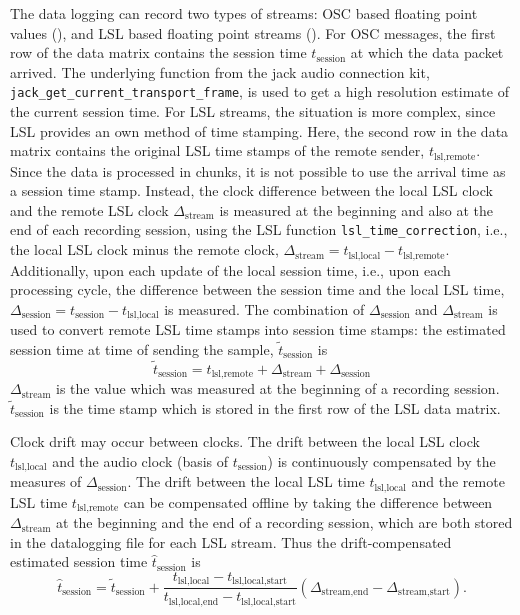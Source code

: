 The data logging can record two types of streams: OSC based floating
point values (), and LSL based floating point streams
().
%
For OSC messages, the first row of the data matrix contains the
session time $t_\text{session}$ at which the data packet arrived.
%
The underlying function from the jack audio connection kit,
\verb!jack_get_current_transport_frame!, is used to get a high
resolution estimate of the current session time.
%
For LSL streams, the situation is more complex, since LSL provides an
own method of time stamping.
%
Here, the second row in the data matrix contains the original LSL time
stamps of the remote sender, $t_\text{lsl,remote}$.
%
Since the data is processed in chunks, it is not possible to use the
arrival time as a session time stamp.
%
Instead, the clock difference between the local LSL clock and the
remote LSL clock $\Delta_\text{stream}$ is measured at the beginning
and also at the end of each recording session, using the LSL function
\verb!lsl_time_correction!, i.e., the local LSL clock minus the remote
clock, $\Delta_\text{stream}=t_\text{lsl,local}-t_\text{lsl,remote}$.
%
Additionally, upon each update of the local session time, i.e., upon
each processing cycle, the difference between the session time and the
local LSL time,
$\Delta_\text{session}=t_\text{session}-t_\text{lsl,local}$ is
measured.
%
The combination of $\Delta_\text{session}$ and $\Delta_\text{stream}$
is used to convert remote LSL time stamps into session time stamps: the estimated session time at time of sending the sample, $\tilde{t}_\text{session}$ is
\begin{equation}
\tilde{t}_\text{session} = t_\text{lsl,remote} + \Delta_\text{stream} + \Delta_\text{session}
\end{equation}
$\Delta_\text{stream}$ is the value which was measured at the
beginning of a recording session. $\tilde{t}_\text{session}$ is the
time stamp which is stored in the first row of the LSL data matrix.

Clock drift may occur between clocks. The drift between the local LSL
clock $t_\text{lsl,local}$ and the audio clock (basis of
$t_\text{session}$) is continuously compensated by the measures of
$\Delta_\text{session}$. The drift between the local LSL time
$t_\text{lsl,local}$ and the remote LSL time $t_\text{lsl,remote}$ can
be compensated offline by taking the difference between
$\Delta_\text{stream}$ at the beginning and the end of a recording
session, which are both stored in the datalogging file for each LSL
stream. Thus the drift-compensated estimated session time
$\hat{t}_\text{session}$ is
\begin{equation}
\hat{t}_\text{session} = \tilde{t}_\text{session} + \frac{t_\text{lsl,local}-t_\text{lsl,local,start}}{t_\text{lsl,local,end}-t_\text{lsl,local,start}} (\Delta_\text{stream,end}-\Delta_\text{stream,start}).
\end{equation}

